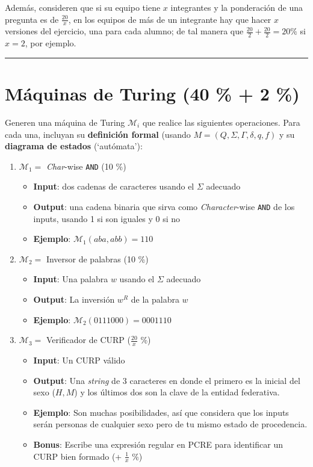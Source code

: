 \documentclass[8pt, onside]{article}
\begin{document}
Además, consideren que si su equipo tiene $x$ integrantes y la ponderación de una pregunta es de $\frac{20}{x}$, en los equipos de más de un integrante hay que hacer $x$ versiones del ejercicio, una para cada alumno;
de tal manera que $\frac{20}{2} + \frac{20}{2} = 20 \%$ si $x=2$, por ejemplo.

\rule{\textwidth}{0.1mm}

\section{Máquinas de Turing (40 \% + 2 \%)}

Generen una máquina de Turing $\mathcal{M}_i$ que realice las siguientes operaciones.
Para cada una, incluyan su \textbf{definición formal} (usando $M = (Q,\Sigma,\Gamma,\delta,q,f)$ y su \textbf{diagrama de estados} (`autómata'):

\begin{enumerate}[label=\tt \alph*)]
    \itemsep0em
    \item $\mathcal{M}_1 =$ \textit{Char}-wise \texttt{AND} (10 \%)
    \begin{itemize}
        \item \textbf{Input}: dos cadenas de caracteres usando el $\Sigma$ adecuado
        \item \textbf{Output}: una cadena binaria que sirva como \textit{Character}-wise \texttt{AND} de los inputs, usando 1 si son iguales y 0 si no
        \item \textbf{Ejemplo}: $\mathcal{M}_1(aba,abb) = 110$
    \end{itemize}
    \pagebreak
    \item $\mathcal{M}_2 = $ Inversor de palabras (10 \%)
    \begin{itemize}
        \item \textbf{Input}: Una palabra $w$ usando el $\Sigma$ adecuado
        \item \textbf{Output}: La inversión $w^R$ de la palabra $w$
        \item \textbf{Ejemplo}: $\mathcal{M}_2(0111000) = 0001110$
    \end{itemize}
    \item $\mathcal{M}_3 = $ Verificador de CURP ($\frac{20}{x}$ \%)
    \begin{itemize}
        \item \textbf{Input}: Un CURP válido
        \item \textbf{Output}: Una \textit{string} de 3 caracteres en donde el primero es la inicial del sexo ($H, M$) y los últimos dos son la clave de la entidad federativa.
        \item \textbf{Ejemplo}: Son muchas posibilidades, así que considera que los inputs serán personas de cualquier sexo pero de tu mismo estado de procedencia.
        \item \textbf{Bonus}: Escribe una expresión regular en PCRE para identificar un CURP bien formado (+ $\frac{1}{x}$ \%)
    \end{itemize}
\end{enumerate}
\end{document}
